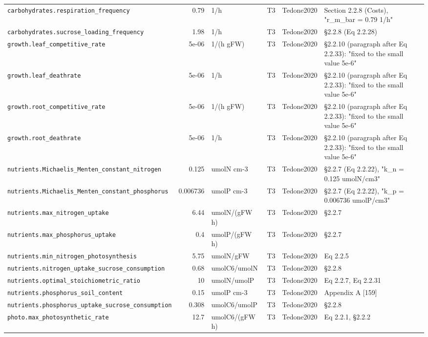 \begin{table}[!htbp]
\begin{tabular}{@{}p{52mm}rp{20mm}cp{20mm}p{38mm}@{}}
\texttt{carbohydrates.respiration\_frequency} & 0.79 & 1/h & T3 & Tedone2020 & Section 2.2.8 (Costs), "r\_m\_bar = 0.79 1/h" \\
\texttt{carbohydrates.sucrose\_loading\_frequency} & 1.98 & 1/h & T3 & Tedone2020 & \S 2.2.8 (Eq 2.2.28) \\
\texttt{growth.leaf\_competitive\_rate} & 5e-06 & 1/(h gFW) & T3 & Tedone2020 & \S 2.2.10 (paragraph after Eq 2.2.33): "fixed to the small value 5e-6" \\
\texttt{growth.leaf\_deathrate} & 5e-06 & 1/h & T3 & Tedone2020 & \S 2.2.10 (paragraph after Eq 2.2.33): "fixed to the small value 5e-6" \\
\texttt{growth.root\_competitive\_rate} & 5e-06 & 1/(h gFW) & T3 & Tedone2020 & \S 2.2.10 (paragraph after Eq 2.2.33): "fixed to the small value 5e-6" \\
\texttt{growth.root\_deathrate} & 5e-06 & 1/h & T3 & Tedone2020 & \S 2.2.10 (paragraph after Eq 2.2.33): "fixed to the small value 5e-6" \\
\texttt{nutrients.Michaelis\_Menten\_constant\_nitrogen} & 0.125 & umolN cm-3 & T3 & Tedone2020 & \S 2.2.7 (Eq 2.2.22), "k\_n = 0.125 umolN/cm3" \\
\texttt{nutrients.Michaelis\_Menten\_constant\_phosphorus} & 0.006736 & umolP cm-3 & T3 & Tedone2020 & \S 2.2.7 (Eq 2.2.22), "k\_p = 0.006736 umolP/cm3" \\
\texttt{nutrients.max\_nitrogen\_uptake} & 6.44 & umolN/(gFW h) & T3 & Tedone2020 & \S 2.2.7 \\
\texttt{nutrients.max\_phosphorus\_uptake} & 0.4 & umolP/(gFW h) & T3 & Tedone2020 & \S 2.2.7 \\
\texttt{nutrients.min\_nitrogen\_photosynthesis} & 5.75 & umolN/gFW & T3 & Tedone2020 & Eq 2.2.5 \\
\texttt{nutrients.nitrogen\_uptake\_sucrose\_consumption} & 0.68 & umolC6/umolN & T3 & Tedone2020 & \S 2.2.8 \\
\texttt{nutrients.optimal\_stoichiometric\_ratio} & 10 & umolN/umolP & T3 & Tedone2020 & Eq 2.2.7, Eq 2.2.31 \\
\texttt{nutrients.phosphorus\_soil\_content} & 0.15 & umolP cm-3 & T3 & Tedone2020 & Appendix A [159] \\
\texttt{nutrients.phosphorus\_uptake\_sucrose\_consumption} & 0.308 & umolC6/umolP & T3 & Tedone2020 & \S 2.2.8 \\
\texttt{photo.max\_photosynthetic\_rate} & 12.7 & umolC6/(gFW h) & T3 & Tedone2020 & Eq 2.2.1, \S 2.2.2 \\

\end{tabular}
\end{table}
